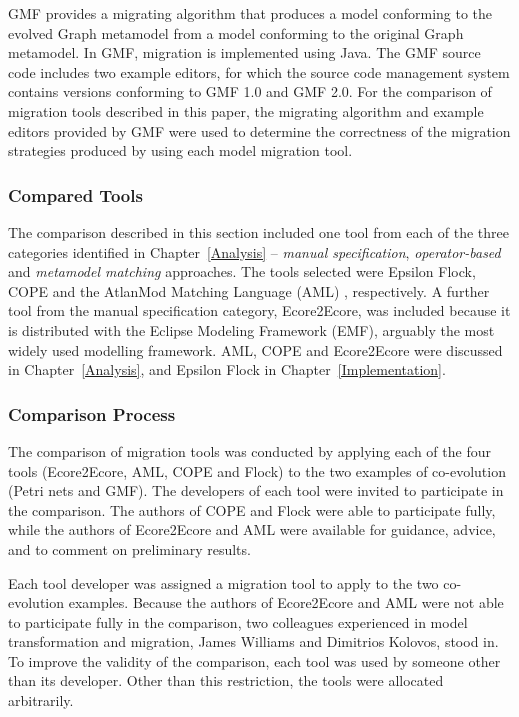 GMF provides a migrating algorithm that produces a model conforming to the evolved Graph metamodel from a model conforming to the original Graph metamodel. In GMF, migration is implemented using Java. The GMF source code includes two example editors, for which the source code management system contains versions conforming to GMF 1.0 and GMF 2.0. For the comparison of migration tools described in this paper, the migrating algorithm and example editors provided by GMF were used to determine the correctness of the migration strategies produced by using each model migration tool. 

\subsubsection{Compared Tools}
\label{subsec:method_tools}
The comparison described in this section included one tool from each of the three categories identified in Chapter~\ref{Analysis} -- \emph{manual specification}, \emph{operator-based} and \emph{metamodel matching} approaches. The tools selected were Epsilon Flock, COPE \cite{herrmannsdoerfer09cope} and the AtlanMod Matching Language (AML) \cite{garces09managing}, respectively. A further tool from the manual specification category, Ecore2Ecore, was included because it is distributed with the Eclipse Modeling Framework (EMF), arguably the most widely used modelling framework. AML, COPE and Ecore2Ecore were discussed in Chapter~\ref{Analysis}, and Epsilon Flock in Chapter~\ref{Implementation}.


\subsubsection{Comparison Process}
\label{subsec:method_process}
The comparison of migration tools was conducted by applying each of the four tools (Ecore2Ecore, AML, COPE and Flock) to the two examples of co-evolution (Petri nets and GMF). The developers of each tool were invited to participate in the comparison. The authors of COPE and Flock were able to participate fully, while the authors of Ecore2Ecore and AML were available for guidance, advice, and to comment on preliminary results.

Each tool developer was assigned a migration tool to apply to the two co-evolution examples. Because the authors of Ecore2Ecore and AML were not able to participate fully in the comparison, two colleagues experienced in model transformation and migration, James Williams and Dimitrios Kolovos, stood in. To improve the validity of the comparison, each tool was used by someone other than its developer. Other than this restriction, the tools were allocated arbitrarily.

